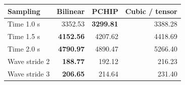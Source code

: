 \begingroup
{}
\begin{tabular}{lrrr}
\toprule
Sampling & Bilinear & PCHIP & Cubic / tensor \\
\midrule
Time 1.0 s & 3352.53 & \textbf{3299.81} & 3388.28 \\
Time 1.5 s & \textbf{4152.56} & 4207.62 & 4418.69 \\
Time 2.0 s & \textbf{4790.97} & 4890.47 & 5266.40 \\
Wave stride 2 & \textbf{188.77} & 192.12 & 216.23 \\
Wave stride 3 & \textbf{206.65} & 214.64 & 231.40 \\
\bottomrule
\end{tabular}
\endgroup
